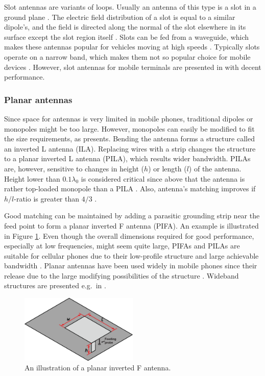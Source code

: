 Slot antennas are variants of loops. Usually an antenna of this type is a slot in a ground plane \cite{stutzman}. The electric field distribution of a slot is equal to a similar dipole's, and the field is directed along the normal of the slot elsewhere in its surface except the slot region itself \cite{volakis}. Slots can be fed from a waveguide, which makes these antennas popular for vehicles moving at high speeds \cite{mobile_antennas_handbook}. Typically slots operate on a narrow band, which makes them not so popular choice for mobile devices \cite{stutzman}. However, slot antennas for mobile terminals are presented in \cite{slot_example1,slot_example2} with decent performance.

\subsubsection{Planar antennas}
\label{sec:planar}

Since space for antennas is very limited in mobile phones, traditional dipoles or monopoles might be too large. However, monopoles can easily be modified to fit the size requirements, as \cite{planar_antennas, balanis} presents. Bending the antenna forms a structure called an inverted L antenna (ILA). Replacing wires with a strip changes the structure to a planar inverted L antenna (PILA), which results wider bandwidth. PILAs are, however, sensitive to changes in height ($h$) or length ($l$) of the antenna. Height lower than $0.1\lambda_0$ is considered critical since above that the antenna is rather top-loaded monopole than a PILA \cite{planar_antennas}. Also, antenna's matching improves if $h/l$-ratio is greater than $4/3$ \cite{planar_antennas}. 

Good matching can be maintained by adding a parasitic grounding strip near the feed point to form a planar inverted F antenna (PIFA). An example is illustrated in Figure \ref{fig:pifa}. Even though the overall dimensions required for good performance, especially at low frequencies, might seem quite large, PIFAs and PILAs are suitable for cellular phones due to their low-profile structure and large achievable bandwidth \cite{balanis}. Planar antennas have been used widely in mobile phones since their release due to the large modifying possibilities of the structure \cite{planar_antennas}. Wideband structures are presented e.g.\ in \cite{pifa_example1,pifa_example2,pila_example1}.

\begin{figure}[H]
    \centering
    \includegraphics[width=0.5\textwidth]{img/pifa.eps}
    \caption{An illustration of a planar inverted F antenna.}
    \label{fig:pifa}
\end{figure}

